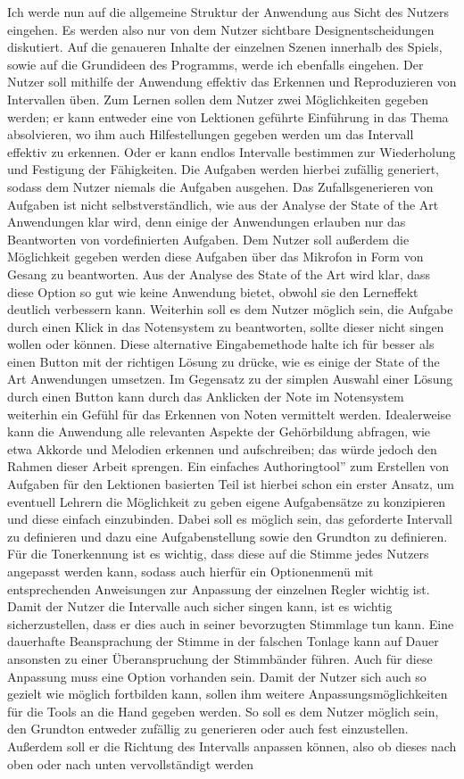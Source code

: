 Ich werde nun auf die allgemeine Struktur der Anwendung aus Sicht des Nutzers eingehen. Es werden also nur von dem Nutzer sichtbare Designentscheidungen diskutiert. Auf die genaueren Inhalte der einzelnen Szenen innerhalb des Spiels, sowie auf die Grundideen des Programms, werde ich ebenfalls eingehen. Der Nutzer soll mithilfe der Anwendung effektiv das Erkennen und Reproduzieren von Intervallen üben. Zum Lernen sollen dem Nutzer zwei Möglichkeiten gegeben werden; er kann entweder eine von Lektionen geführte Einführung in das Thema absolvieren, wo ihm auch Hilfestellungen gegeben werden um das Intervall effektiv zu erkennen. Oder er kann endlos Intervalle bestimmen zur Wiederholung und Festigung der Fähigkeiten. Die Aufgaben werden hierbei zufällig generiert, sodass dem Nutzer niemals die Aufgaben ausgehen. Das Zufallsgenerieren von Aufgaben ist nicht selbstverständlich, wie aus der Analyse der State of the Art Anwendungen klar wird, denn einige der Anwendungen erlauben nur das Beantworten von vordefinierten Aufgaben. Dem Nutzer soll außerdem die Möglichkeit gegeben werden diese Aufgaben über das Mikrofon in Form von Gesang zu beantworten. Aus der Analyse des State of the Art wird klar, dass diese Option so gut wie keine Anwendung bietet, obwohl sie den Lerneffekt deutlich verbessern kann. Weiterhin soll es dem Nutzer möglich sein, die Aufgabe durch einen Klick in das Notensystem zu beantworten, sollte dieser nicht singen wollen oder können. Diese alternative Eingabemethode halte ich für besser als einen Button mit der richtigen Lösung zu drücke, wie es einige der State of the Art Anwendungen umsetzen. Im Gegensatz zu der simplen Auswahl einer Lösung durch einen Button kann durch das Anklicken der Note im Notensystem weiterhin ein Gefühl für das Erkennen von Noten vermittelt werden. Idealerweise kann die Anwendung alle relevanten Aspekte der Gehörbildung abfragen, wie etwa Akkorde und Melodien erkennen und aufschreiben; das würde jedoch den Rahmen dieser Arbeit sprengen. Ein einfaches \glqq Authoringtool'' zum Erstellen von Aufgaben für den Lektionen basierten Teil ist hierbei schon ein erster Ansatz, um eventuell Lehrern die Möglichkeit zu geben eigene Aufgabensätze zu konzipieren und diese einfach einzubinden. Dabei soll es möglich sein, das geforderte Intervall zu definieren und dazu eine Aufgabenstellung sowie den Grundton zu definieren. Für die Tonerkennung ist es wichtig, dass diese auf die Stimme jedes Nutzers angepasst werden kann, sodass auch hierfür ein Optionenmenü mit entsprechenden Anweisungen zur Anpassung der einzelnen Regler wichtig ist. Damit der Nutzer die Intervalle auch sicher singen kann, ist es wichtig sicherzustellen, dass er dies auch in seiner bevorzugten Stimmlage tun kann. Eine dauerhafte Beansprachung der Stimme in der falschen Tonlage kann auf Dauer ansonsten zu einer Überanspruchung der Stimmbänder führen. Auch für diese Anpassung muss eine Option vorhanden sein. Damit der Nutzer sich auch so gezielt wie möglich fortbilden kann, sollen ihm weitere Anpassungsmöglichkeiten für die Tools an die Hand gegeben werden. So soll es dem Nutzer möglich sein, den Grundton entweder zufällig zu generieren oder auch fest einzustellen. Außerdem soll er die Richtung des Intervalls anpassen können, also ob dieses nach oben oder nach unten vervollständigt werden 